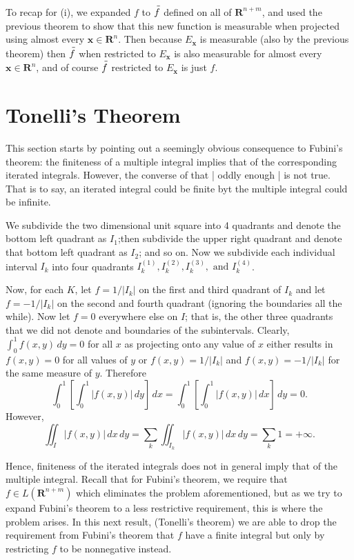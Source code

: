 \documentclass[12pt]{book}
\renewcommand{\vec}[1]{\mathbf{#1}}
\newcommand{\R}{\mathbf{R}}
\newcommand{\tand}{\text{ and }}
\renewcommand{\.}{\mkern1mu}
\newcommand{\abs}[1]{\left| #1 \right|}
\theoremstyle{theorem}
\renewcommand{\bar}[1]{\overset{\hspace{3pt}\rule[0.5pt]{\widthof{#1}}  
	{0.1ex}}{#1}}
\begin{document}
	To recap for (i), we expanded $f$ to $\bar{f}$ defined on all of $\R^{n+m}$, and used the previous theorem to show that this new function is measurable when projected using almost every $\vec x \in \R^n$. Then because $E_\vec x$ is measurable (also by the previous theorem) then $\bar{f}$ when restricted to $E_\vec x$ is also measurable for almost every $\vec x \in \R^n$, and of course $\bar{f}$ restricted to $E_\vec x$ is just $f$.
	
\section{Tonelli's Theorem}
	This section starts by pointing out a seemingly obvious consequence to Fubini's theorem: the finiteness of a multiple integral implies that of the corresponding iterated integrals. However, the converse of that | oddly enough | is not true. That is to say, an iterated integral could be finite byt the multiple integral could be infinite.
	
	We subdivide the two dimensional unit square into 4 quadrants and denote the bottom left quadrant as $I_1$;then subdivide the upper right quadrant and denote that bottom left quadrant as $I_2$; and so on. Now we subdivide each individual interval $I_k$ into four quadrants $I_k^{(1)}, I_k^{(2)}, I_k^{(3)}, \tand I_k^{(4)}$.
	
	Now, for each $K$, let $f = 1/\abs{I_k}$ on the first and third quadrant of $I_k$ and let $f = -1/\abs{I_k}$ on the second and fourth quadrant (ignoring the boundaries all the while). Now let $f = 0$ everywhere else on $I$; that is, the other three quadrants that we did not denote and boundaries of the subintervals. Clearly, $\int_0^1 f(x,y)\, dy = 0$ for all $x$ as projecting onto any value of $x$ either results in $f(x,y) = 0$ for all values of $y$ or $f(x,y) = 1/\abs{I_k}$ and $f(x,y) = -1/\abs{I_k}$ for the same measure of $y$. Therefore
		\[
			\int_0^1 \left[ \int_0^1 \abs{f(x,y)}\, dy \right]\, dx = \int_0^1 \left[ \int_0^1 \abs{f(x,y)}\, dx\right]\, dy = 0.
		\]
	However,
		\[
			\iint_I \abs{f(x,y)}\, dx\, dy = \sum_k \iint_{I_k} \abs{f(x,y)}\, dx\, dy = \sum_k 1 = +\infty.
		\]
		
	Hence, finiteness of the iterated integrals does not in general imply that of the multiple integral. Recall that for Fubini's theorem, we require that $f \in L(\R^{n+m})$ which eliminates the problem aforementioned, but as we try to expand Fubini's theorem to a less restrictive requirement, this is where the problem arises. In this next result, (Tonelli's theorem) we are able to drop the requirement from Fubini's theorem that $f$ have a finite integral but only by restricting $f$ to be nonnegative instead.\\
	
\end{document}
